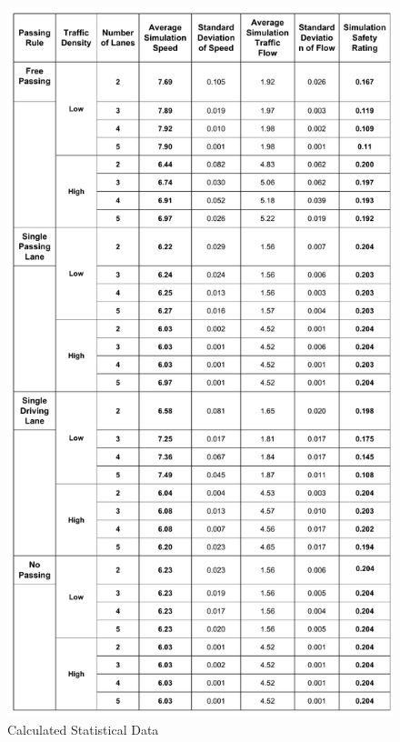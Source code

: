 \documentclass{amsart}
\begin{document}
	\begin{figure}[h]
	\centering
	\includegraphics[scale=0.25]{MCMStatisticalAnalysisOfTrafficFlow}
	\caption{Calculated Statistical Data}
	\label{MCMStatisticalAnalysisOfTrafficFlow}
	\end{figure}
	
\end{document}
